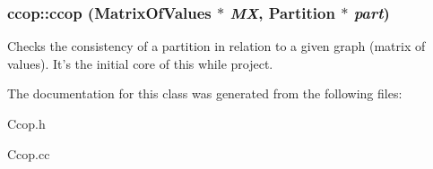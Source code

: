 \subsubsection{\setlength{\rightskip}{0pt plus 5cm}ccop::ccop ({\bf Matrix\-Of\-Values} $\ast$ {\em MX}, Partition $\ast$ {\em part})}\label{classccop_a0}


Checks the consistency of a partition in relation to a given graph (matrix of values). It's the initial core of this while project. 

The documentation for this class was generated from the following files:\begin{CompactItemize}
\item 
Ccop.h\item 
Ccop.cc\end{CompactItemize}
